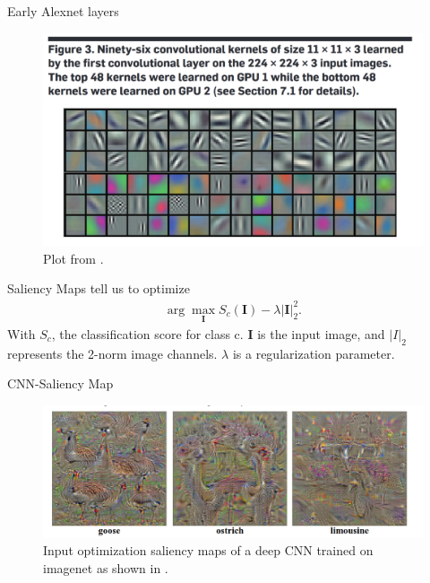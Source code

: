 \documentclass{beamer}
\begin{document}
    \begin{frame}{Early Alexnet layers}
      \begin{figure}
        \includegraphics[width=0.9\linewidth]{./figures/alexnet_layer1.png}
        \caption{Plot from \cite{krizhevsky2017imagenet}.}
      \end{figure}
    \end{frame}

    \begin{frame}{Saliency Maps}
      \cite{simonyan2013deep} tell us to optimize
      \begin{align}
        \arg \max_{\mathbf{I}} S_c(\mathbf{I}) - \lambda | \mathbf{I} |_2^2 .
      \end{align}
      With $S_c$, the classification score for class c. $\mathbf{I}$ is the input image,
      and $|I|_2$ represents the 2-norm image channels. $\lambda$ is a regularization
      parameter.
    \end{frame}


    \begin{frame}{CNN-Saliency Map}
      \begin{figure}
      \includegraphics[width=0.9\linewidth]{./figures/sali.png}
      \caption{Input optimization saliency maps of a deep CNN trained on imagenet as shown in \cite{simonyan2013deep}.}
      \end{figure}
    \end{frame}
\end{document}
